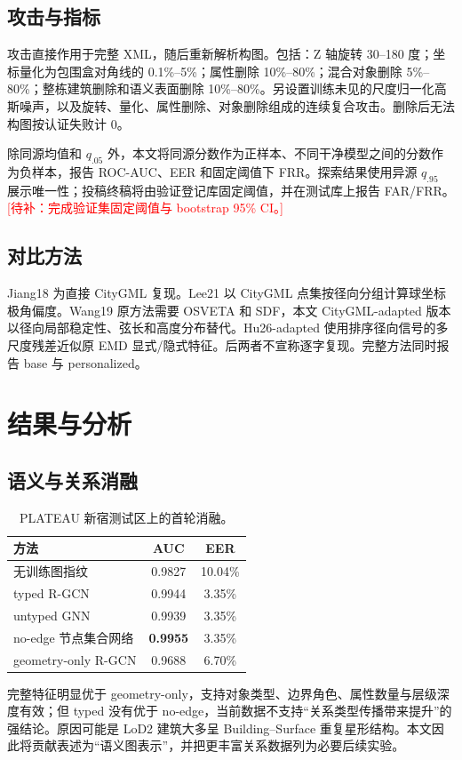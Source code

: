 \documentclass[UTF8,fontset=fandol,12pt]{ctexart}
\newcommand{\todo}[1]{\textcolor{red}{[待补：#1]}}
\begin{document}
\subsection{攻击与指标}
攻击直接作用于完整 XML，随后重新解析构图。包括：Z 轴旋转 30--180 度；坐标量化为包围盒对角线的 0.1\%--5\%；属性删除 10\%--80\%；混合对象删除 5\%--80\%；整栋建筑删除和语义表面删除 10\%--80\%。另设置训练未见的尺度归一化高斯噪声，以及旋转、量化、属性删除、对象删除组成的连续复合攻击。删除后无法构图按认证失败计 0。

除同源均值和 $q_{.05}$ 外，本文将同源分数作为正样本、不同干净模型之间的分数作为负样本，报告 ROC-AUC、EER 和固定阈值下 FRR。探索结果使用异源 $q_{.95}$ 展示唯一性；投稿终稿将由验证登记库固定阈值，并在测试库上报告 FAR/FRR。\todo{完成验证集固定阈值与 bootstrap 95\% CI。}

\subsection{对比方法}
Jiang18 为直接 CityGML 复现。Lee21 以 CityGML 点集按径向分组计算球坐标极角偏度。Wang19 原方法需要 OSVETA 和 SDF，本文 CityGML-adapted 版本以径向局部稳定性、弦长和高度分布替代。Hu26-adapted 使用排序径向信号的多尺度残差近似原 EMD 显式/隐式特征。后两者不宣称逐字复现。完整方法同时报告 base 与 personalized。

\section{结果与分析}
\subsection{语义与关系消融}
\begin{table}[H]\centering
\caption{PLATEAU 新宿测试区上的首轮消融。}\label{tab:ablation}
\begin{tabular}{lcc}
\toprule 方法 & AUC & EER \\
\midrule 无训练图指纹 & 0.9827 & 10.04\%\\
typed R-GCN & 0.9944 & 3.35\%\\
untyped GNN & 0.9939 & 3.35\%\\
no-edge 节点集合网络 & \textbf{0.9955} & 3.35\%\\
geometry-only R-GCN & 0.9688 & 6.70\%\\
\bottomrule
\end{tabular}
\end{table}
完整特征明显优于 geometry-only，支持对象类型、边界角色、属性数量与层级深度有效；但 typed 没有优于 no-edge，当前数据不支持“关系类型传播带来提升”的强结论。原因可能是 LoD2 建筑大多呈 Building--Surface 重复星形结构。本文因此将贡献表述为“语义图表示”，并把更丰富关系数据列为必要后续实验。
\end{document}
